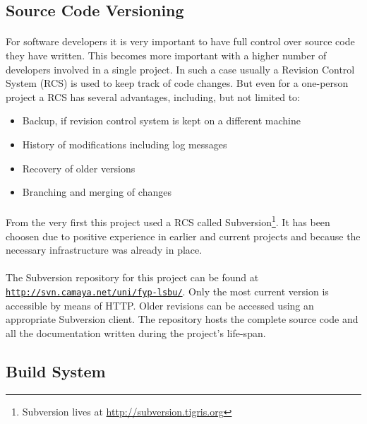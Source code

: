 \subsection{Source Code Versioning}
\paragraph{}
For software developers it is very important to have full control over source code they have written. This becomes more important with a higher number of developers involved in a single project. In such a case usually a Revision Control System (RCS) is used to keep track of code changes. But even for a one-person project a RCS has several advantages, including, but not limited to:

\begin{itemize}
\item Backup, if revision control system is kept on a different machine
\item History of modifications including log messages
\item Recovery of older versions
\item Branching and merging of changes
\end{itemize}

\paragraph{}
From the very first this project used a RCS called Subversion\footnote{Subversion lives at \href{http://subversion.tigris.org}{http://subversion.tigris.org}}. It has been choosen due to positive experience in earlier and current projects and because the necessary infrastructure was already in place.

\paragraph{}
The Subversion repository for this project can be found at \\ \texttt{\href{http://svn.camaya.net/uni/fyp-lsbu/}{http://svn.camaya.net/uni/fyp-lsbu/}}. Only the most current version is accessible by means of HTTP. Older revisions can be accessed using an appropriate Subversion client. The repository hosts the complete source code and all the documentation written during the project's life-span.


\subsection{Build System}
